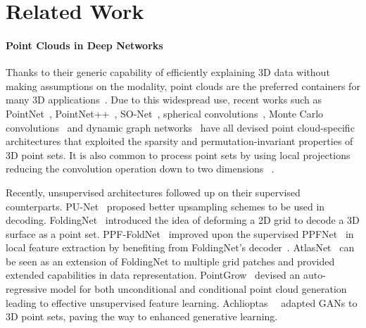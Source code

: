 \documentclass[10pt,twocolumn,letterpaper]{article}
\theoremstyle{break}
\begin{document}
%
 \section{Related Work}
\label{sec:related_work}

\paragraph{Point Clouds in Deep Networks}
Thanks to their generic capability of efficiently explaining 3D data without making assumptions on the modality, point clouds are the preferred containers for many 3D applications~\cite{Zhou_2018_CVPR,naseer2018indoor}. Due to this widespread use, recent works such as PointNet~\cite{qi2017pointnet}, PointNet++~\cite{Qi2017PointNetDH}, SO-Net~\cite{li2018so}, spherical convolutions~\cite{lei2018spherical}, Monte Carlo convolutions~\cite{hermosilla2018monte} and dynamic graph networks~\cite{dgcnn} have all devised point cloud-specific architectures that exploited the sparsity and permutation-invariant properties of 3D point sets. It is also common to process point sets by using local projections reducing the convolution operation down to two dimensions ~\cite{tatarchenko2018tangent,huang2018learning}.

Recently, unsupervised architectures followed up on their supervised counterparts. PU-Net~\cite{yu2018pu} proposed better upsampling schemes to be used in decoding. FoldingNet~\cite{Yang_2018_CVPR} introduced the idea of deforming a 2D grid to decode a 3D surface as a point set. PPF-FoldNet~\cite{Deng_2018_ECCV} improved upon the supervised PPFNet~\cite{deng2018ppfnet} in local feature extraction by benefiting from FoldingNet's decoder~\cite{Yang_2018_CVPR}. AtlasNet~\cite{groueix2018} can be seen as an extension of FoldingNet to multiple grid patches and provided extended capabilities in data representation. 
PointGrow~\cite{sun2018pointgrow} devised an auto-regressive model for both unconditional and conditional point cloud generation leading to effective unsupervised feature learning.
Achlioptas~\etal~\cite{achlioptas2017latent_pc} adapted GANs to 3D point sets, paving the way to enhanced generative learning. 
\end{document}

